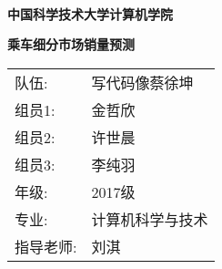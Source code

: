 \documentclass{article}
\begin{document}
\begin{center}
    \ 
    \\[1cm]
    \Huge{\textbf{中国科学技术大学计算机学院}}
    \vspace{5mm}
    
    \huge{}
    \vspace{12mm}
    
    \huge{}
    \vspace{1cm}
    
    \huge{\textbf{乘车细分市场销量预测}}
    \vspace{4cm}
    
    \Large{
        \begin{tabular}{ll}
            队伍: & 写代码像蔡徐坤\\
            组员1: & 金哲欣\\
            组员2: & 许世晨\\
            组员3: & 李纯羽\\
            年级:  & 2017级\\
            专业: & 计算机科学与技术\\
            指导老师: & 刘淇
        \end{tabular}
    }
    \vspace{1.5cm}

    \vspace{0.5cm}

    \end{center}

    \newpage

    \tableofcontents

    \newpage
\end{document}
